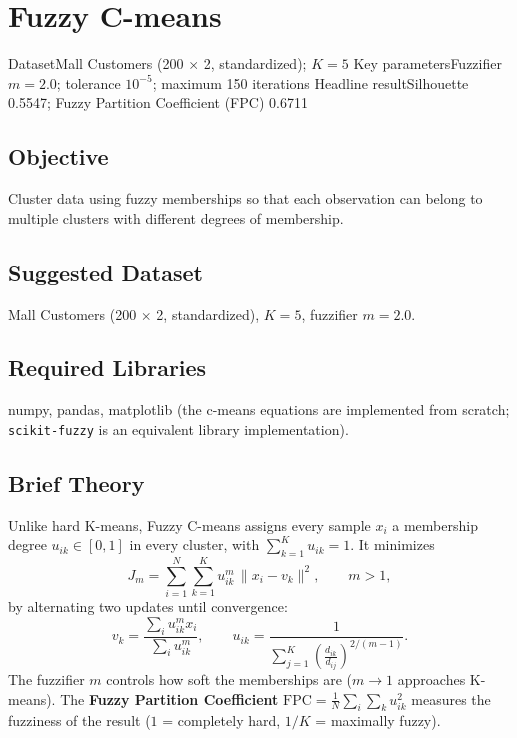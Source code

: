 \chapter{Fuzzy C-means}\label{exp:04}


\quickfacts
  {Dataset}{Mall Customers (200 $\times$ 2, standardized); $K = 5$}
  {Key parameters}{Fuzzifier $m = 2.0$; tolerance $10^{-5}$; maximum 150 iterations}
  {Headline result}{Silhouette 0.5547; Fuzzy Partition Coefficient (FPC) 0.6711}

\section{Objective}
Cluster data using fuzzy memberships so that each observation can belong to multiple
clusters with different degrees of membership.

\section{Suggested Dataset}
Mall Customers (200 $\times$ 2, standardized), $K = 5$, fuzzifier $m = 2.0$.

\section{Required Libraries}
numpy, pandas, matplotlib (the c-means equations are implemented from scratch;
\texttt{scikit-fuzzy} is an equivalent library implementation).

\section{Brief Theory}
Unlike hard K-means, Fuzzy C-means assigns every sample $x_i$ a membership degree
$u_{ik} \in [0,1]$ in every cluster, with $\sum_{k=1}^{K} u_{ik} = 1$. It minimizes
\[
J_m = \sum_{i=1}^{N}\sum_{k=1}^{K} u_{ik}^{m}\,\lVert x_i - v_k \rVert^2 , \qquad m > 1 ,
\]
by alternating two updates until convergence:
\[
v_k = \frac{\sum_i u_{ik}^{m} x_i}{\sum_i u_{ik}^{m}},
\qquad
u_{ik} = \frac{1}{\sum_{j=1}^{K}\left(\frac{d_{ik}}{d_{ij}}\right)^{2/(m-1)}} .
\]
The fuzzifier $m$ controls how soft the memberships are ($m \to 1$ approaches K-means). The
\textbf{Fuzzy Partition Coefficient} $\mathrm{FPC} = \frac{1}{N}\sum_i \sum_k u_{ik}^2$
measures the fuzziness of the result ($1$ = completely hard, $1/K$ = maximally fuzzy).


